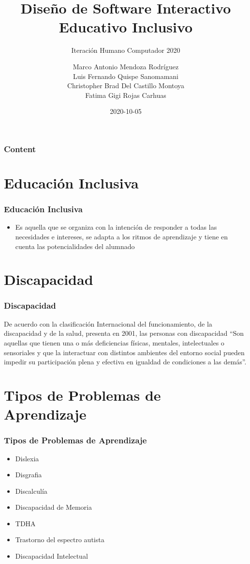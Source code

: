 \documentclass[11pt]{beamer}
\title[Presentación]{\bf\Huge Diseño de Software Interactivo Educativo Inclusivo}
\subtitle{Iteración Humano Computador 2020}
\author[IHC2020]
{
	Marco Antonio Mendoza Rodríguez \\
    Luis Fernando Quispe Sanomamani\\
    Christopher Brad Del Castillo Montoya\\
    Fatima Gigi Rojas Carhuas\\
}
\institute[UNSA]
{
\inst{1}%
Universidad Nacional de San Agustin\\
Escuela Profesional de Ingenieria de Sistemas
}
\date[2020-10-05]{\scriptsize{2020-10-05}}
\begin{document}
\begin{frame}
\titlepage
\end{frame}

\begin{frame}
\frametitle{Content}
\tableofcontents
\end{frame}

\section{Educación Inclusiva}
\begin{frame}
\frametitle{Educación Inclusiva}
\begin{itemize}
\item Es aquella que se organiza con la intención de responder a todas las necesidades e intereses, se adapta a los ritmos de aprendizaje y tiene en cuenta las potencialidades del alumnado

\end{itemize}
\end{frame}


\section{Discapacidad}
\begin{frame}
\frametitle{Discapacidad}
De acuerdo con la clasificación Internacional del funcionamiento, de la discapacidad y de la salud, presenta en 2001, las personas con discapacidad “Son aquellas que tienen una o más deficiencias físicas, mentales, intelectuales o sensoriales y que la interactuar con distintos ambientes del entorno social pueden impedir su participación plena y efectiva en igualdad de condiciones a las demás”.
\end{frame}


\section{Tipos de Problemas de Aprendizaje}
\begin{frame}
\frametitle{Tipos de Problemas de Aprendizaje}
\begin{itemize}
\item Dislexia
\item Disgrafia
\item Discalculía
\item Discapacidad de Memoria
\item TDHA
\item Trastorno del espectro autista
\item Discapacidad Intelectual
\end{itemize}
\end{frame}
\end{document}

